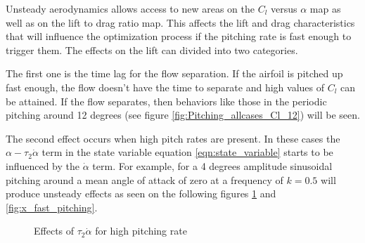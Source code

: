 Unsteady aerodynamics allows access to new areas on the $C_l$ versus $\alpha$ map as well as on the lift to drag ratio map.
This affects the lift and drag characteristics that will influence the optimization process if the pitching rate is fast enough to trigger them.
The effects on the lift can divided into two categories.

\par The first one is the time lag for the flow separation. 
If the airfoil is pitched up fast enough, the flow doesn't have the time to separate and high values of $C_l$ can be attained.
If the flow separates, then behaviors like those in the periodic pitching around 12 degrees (see figure \ref{fig:Pitching_allcases_Cl_12}) will be seen.

\par The second effect occurs when high pitch rates are present.
In these cases the $\alpha - \tau_2 \dot{\alpha}$ term in the state variable equation \ref{eqn:state_variable} starts to be influenced by the $\dot{\alpha}$ term. 
For example, for a 4 degrees amplitude sinusoidal pitching around a mean angle of attack of zero at a frequency of $k=0.5$ will produce unsteady effects as seen on the following figures \ref{fig:alpha_dalpha_vs_t} and \ref{fig:x_fast_pitching}.

\begin{figure}[h]
  \centering
  \caption{Effects of $\tau_2 \dot{\alpha}$ for high pitching rate}
  \label{fig:alpha_dalpha_vs_t}
\end{figure}

